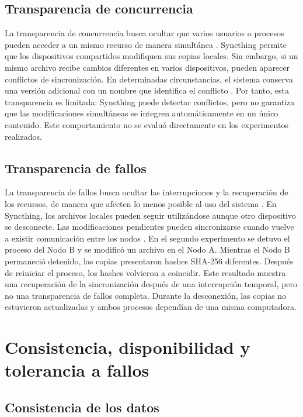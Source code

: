 \documentclass[12pt,a4paper]{article}
\begin{document}
\subsection{Transparencia de concurrencia}

La transparencia de concurrencia busca ocultar que varios usuarios o procesos pueden acceder a un mismo recurso de manera simultánea \cite{vansteen2023}.
Syncthing permite que los dispositivos compartidos modifiquen sus copias locales. Sin embargo, si un mismo archivo recibe cambios 
diferentes en varios dispositivos, pueden aparecer conflictos de sincronización. En determinadas circunstancias, el sistema conserva una versión adicional con un nombre que identifica el conflicto \cite{syncthingSyncing}.
Por tanto, esta transparencia es limitada: Syncthing puede detectar conflictos, pero no garantiza que las modificaciones simultáneas se integren automáticamente en un único contenido. Este comportamiento no se evaluó directamente en los experimentos realizados.

\subsection{Transparencia de fallos}

La transparencia de fallos busca ocultar las interrupciones y la recuperación de los recursos, 
de manera que afecten lo menos posible al uso del sistema \cite{vansteen2023}.
En Syncthing, los archivos locales pueden seguir utilizándose aunque otro dispositivo se desconecte. 
Las modificaciones pendientes pueden sincronizarse cuando vuelve a existir comunicación entre los nodos \cite{syncthingFAQ,syncthingSyncing}.
En el segundo experimento se detuvo el proceso del Nodo B y se modificó un archivo en el Nodo A.
 Mientras el Nodo B permaneció detenido, las copias presentaron hashes SHA-256 diferentes. 
Después de reiniciar el proceso, los hashes volvieron a coincidir.
Este resultado muestra una recuperación de la sincronización después de una interrupción temporal, 
pero no una transparencia de fallos completa. Durante la desconexión, las copias no estuvieron actualizadas y ambos procesos dependían de una misma computadora.

\section{Consistencia, disponibilidad y tolerancia a fallos}

\subsection{Consistencia de los datos}
\end{document}
